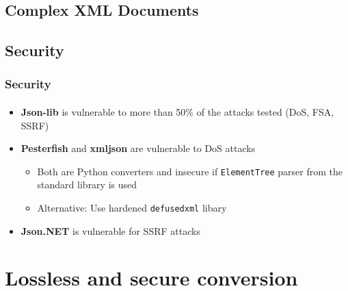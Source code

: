 \documentclass[
    alternativetitlepage=alternativ,
    cornerlogo=hgi_nds_logo2,
    sectionoverview,
]{rubpresentation}
\begin{document}
\subsection{Complex XML Documents}

\begingroup
  \begin{frame}[fragile]
    \vspace{-1.15cm}
    \begin{center}
      
    \end{center}
  \end{frame}
\endgroup

\subsection{Security}

\begin{frame}
  \frametitle{Security}
  \framesubtitle{}
  \begin{itemize}
    \item{} \textbf{Json-lib} is vulnerable to more than 50\% of the attacks tested (DoS, FSA, SSRF)
    \item{} \textbf{Pesterfish} and \textbf{xmljson} are vulnerable to DoS attacks
      \begin{itemize}
        \item{} Both are Python converters and insecure if \texttt{ElementTree} parser from the standard library is used
        \item{} Alternative: Use hardened \texttt{defusedxml} libary
      \end{itemize}
    \item{} \textbf{Json.NET} is vulnerable for SSRF attacks
  \end{itemize}
\end{frame}

\begingroup
  \begin{frame}[fragile]
    \vspace{-1.15cm}
    \begin{center}
      
    \end{center}
  \end{frame}
\endgroup

\section{Lossless and secure conversion}
\end{document}
